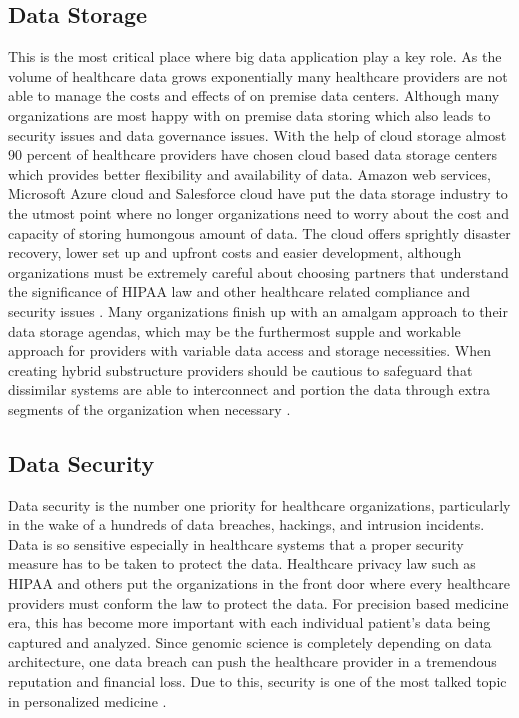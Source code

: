 \documentclass[sigconf]{acmart}
\begin{document}
\subsection{Data Storage} This is the most critical place where big data application play a key role.  As the volume of healthcare data grows exponentially many healthcare providers are not able to manage the costs and effects of on premise data centers. Although many organizations are most happy with on premise data storing which also leads to security issues and data governance issues. With the help of cloud storage almost 90 percent of healthcare providers have chosen cloud based data storage centers which provides better flexibility and availability of data. Amazon web services, Microsoft Azure cloud and Salesforce cloud have put the data storage industry to the utmost point where no longer organizations need to worry about the cost and capacity of storing humongous amount of data. The cloud offers sprightly disaster recovery, lower set up and upfront costs and easier development, although organizations must be extremely careful about choosing partners that understand the significance of HIPAA law and other healthcare related compliance and security issues \cite{editor02}. Many organizations finish up with an amalgam approach to their data storage agendas, which may be the furthermost supple and workable approach for providers with variable data access and storage necessities.  When creating hybrid substructure providers should be cautious to safeguard that dissimilar systems are able to interconnect and portion the data through extra segments of the organization when necessary \cite{editor07}.

\subsection{Data Security} Data security is the number one priority for healthcare organizations, particularly in the wake of a hundreds of data breaches, hackings, and intrusion incidents.  Data is so sensitive especially in healthcare systems that a proper security measure has to be taken to protect the data.  Healthcare privacy law such as HIPAA and others put the organizations in the front door where every healthcare providers must conform the law to protect the data. For precision based medicine era, this has become more important with each individual patient’s data being captured and analyzed. Since genomic science is completely depending on data architecture, one data breach can push the healthcare provider in a tremendous reputation and financial loss. Due to this, security is one of the most talked topic in personalized medicine \cite{editor05}.
\end{document}
